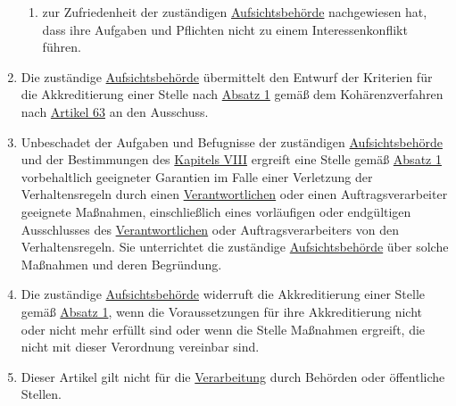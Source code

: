 \begin{enumerate}
\begin{enumerate}
    \item zur Zufriedenheit der zuständigen \hyperref[itm:04-21]{Aufsichtsbehörde} nachgewiesen hat, dass ihre Aufgaben und Pflichten nicht zu
     einem Interessenkonflikt führen.
    \label{itm:41-2d}

  \end{enumerate}

  \item Die zuständige \hyperref[itm:04-21]{Aufsichtsbehörde} übermittelt den Entwurf der Kriterien für die Akkreditierung einer Stelle nach
   \hyperref[itm:41-1]{Absatz 1} gemäß dem Kohärenzverfahren nach \hyperref[ch:63]{Artikel 63} an den Ausschuss.
  \label{itm:41-3}

  \item Unbeschadet der Aufgaben und Befugnisse der zuständigen \hyperref[itm:04-21]{Aufsichtsbehörde} und der Bestimmungen des \hyperref
   [part:8]{Kapitels VIII} ergreift eine Stelle gemäß \hyperref[itm:41-1]{Absatz 1} vorbehaltlich geeigneter Garantien
   im Falle einer Verletzung der Verhaltensregeln durch einen \hyperref[itm:04-7]{Verantwortlichen} oder einen Auftragsverarbeiter geeignete
   Maßnahmen, einschließlich eines vorläufigen oder endgültigen Ausschlusses des \hyperref[itm:04-7]{Verantwortlichen} oder
   Auftragsverarbeiters von den Verhaltensregeln. Sie unterrichtet die zuständige \hyperref[itm:04-21]{Aufsichtsbehörde} über solche
   Maßnahmen und deren Begründung.
  \label{itm:41-4}

  \item Die zuständige \hyperref[itm:04-21]{Aufsichtsbehörde} widerruft die Akkreditierung einer Stelle gemäß \hyperref[itm:41-1]{Absatz 1},
   wenn die Voraussetzungen für ihre Akkreditierung nicht oder nicht mehr erfüllt sind oder wenn die Stelle Maßnahmen
   ergreift, die nicht mit dieser Verordnung vereinbar sind.
  \label{itm:41-5}

  \item Dieser Artikel gilt nicht für die \hyperref[itm:04-2]{Verarbeitung} durch Behörden oder öffentliche Stellen.
  \label{itm:41-6}

\end{enumerate}


